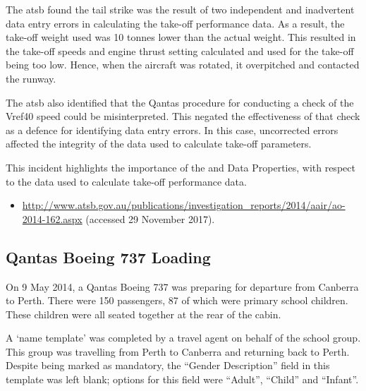 The \gls{atsb} found the tail strike was the result of two independent and inadvertent data entry errors in calculating the take-off performance data. As a result, the take-off weight used was 10 tonnes lower than the actual weight. This resulted in the take-off speeds and engine thrust setting calculated and used for the take-off being too low. Hence, when the aircraft was rotated, it overpitched and contacted the runway.

The \gls{atsb} also identified that the Qantas procedure for conducting a check of the Vref40 speed could be misinterpreted. This negated the effectiveness of that check as a defence for identifying data entry errors. In this case, uncorrected errors affected the integrity of the data used to calculate take-off parameters.

This incident highlights the importance of the  and  Data Properties, with respect to the data used to calculate take-off performance data.

\begin{samepage}
\begin{itemize}
  \item \raggedright{\href{http://www.atsb.gov.au/publications/investigation_reports/2014/aair/ao-2014-162.aspx}{http://www.atsb.gov.au/publications/investigation\_reports/2014/aair/ao-2014-162.aspx} (accessed 29 November 2017).}
\end{itemize}
\end{samepage}


\subsection{Qantas Boeing 737 Loading} \label{bkm:incacc:qantasloading}
On 9 May 2014, a Qantas Boeing 737 was preparing for departure from Canberra to Perth. There were 150 passengers, 87 of which were primary school children. These children were all seated together at the rear of the cabin. 

A `name template' was completed by a travel agent on behalf of the school group. This group was travelling from Perth to Canberra and returning back to Perth. Despite being marked as mandatory, the ``Gender Description'' field in this template was left blank; options for this field were ``Adult'', ``Child'' and ``Infant''.

